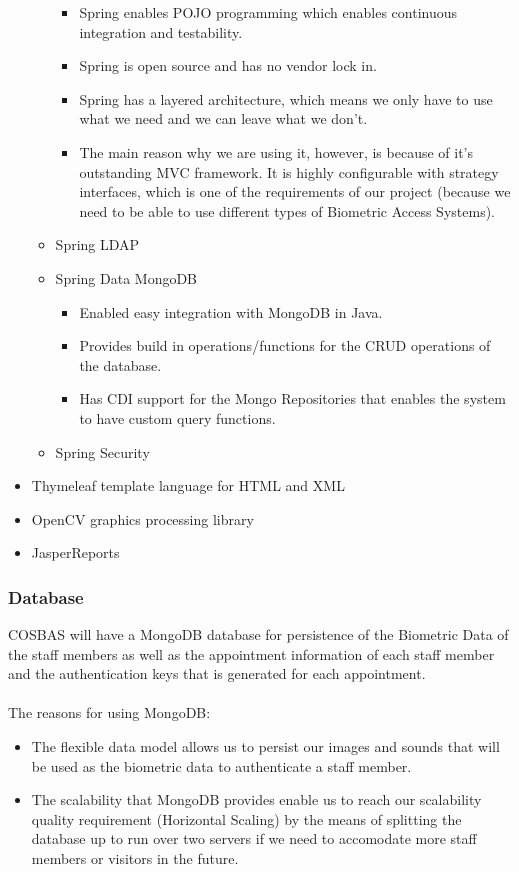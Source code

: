 \begin{itemize}
\begin{itemize}
\begin{itemize}
					\item Spring enables POJO programming which enables continuous integration and testability.
					\item Spring is open source and has no vendor lock in.
					\item Spring has a layered architecture, which means we only have to use what we need and we can leave what we don't.
					\item The main reason why we are using it, however, is because of it's outstanding MVC framework. It is highly configurable with strategy interfaces, which is one of the requirements of our project (because we need to be able to use different types of Biometric Access Systems).
				\end{itemize}
			\item Spring LDAP
			\item Spring Data MongoDB
				\begin{itemize}
					\item Enabled easy integration with MongoDB in Java.
					\item Provides build in operations/functions for the CRUD operations of the database.
					\item Has CDI support for the Mongo Repositories that enables the system to have custom query functions.
				\end{itemize}
			\item Spring Security
		\end{itemize}
	\item Thymeleaf template language for HTML and XML
	\item OpenCV graphics processing library
	\item JasperReports
\end{itemize}

\subsubsection{Database}
COSBAS will have a MongoDB database for persistence of the Biometric Data of the staff members as well as the appointment information of each staff member and the authentication keys that is generated for each appointment. \\
\\
The reasons for using MongoDB:
	\begin{itemize}
		\item The flexible data model allows us to persist our images and sounds that will be used as the biometric data to authenticate a staff member.
		\item The scalability that MongoDB provides enable us to reach our scalability quality requirement (Horizontal Scaling) by the means of splitting the database up to run over two servers if we need to accomodate more staff members or visitors in the future.
	\end{itemize}

